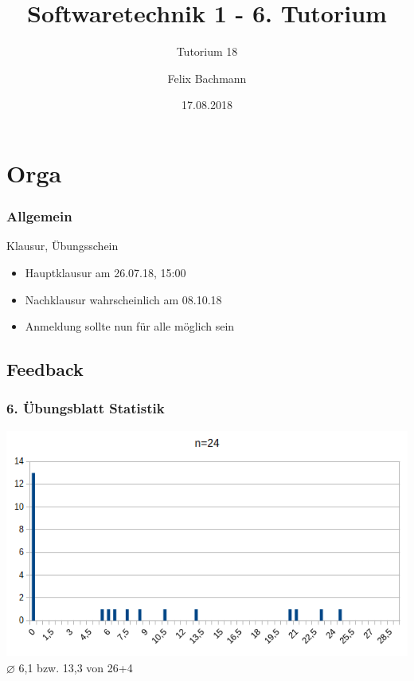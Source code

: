 \documentclass[18pt]{beamer}
\title[SWT1]{Softwaretechnik 1 - 6. Tutorium}
\subtitle{Tutorium 18}
\author{Felix Bachmann}
\date{17.08.2018}
\institute{KIT - Institut für Programmstrukturen und Datenorganisation (IPD)}
\begin{document}
	
\setcounter{tocdepth}{2}
	
\begin{frame}
\titlepage
\end{frame}

\begin{frame}
\tableofcontents
\end{frame}


\section{Orga}
	\begin{frame}
		\frametitle{Allgemein}
		\begin{block}{Klausur, Übungsschein}
			\begin{itemize}
				\item Hauptklausur am 26.07.18, 15:00
				\item Nachklausur wahrscheinlich am 08.10.18
				\item Anmeldung sollte nun für alle möglich sein
			\end{itemize}
		\end{block}
	\end{frame}

	\subsection{Feedback}
	\begin{frame}
		\frametitle{6. Übungsblatt Statistik}
		\includegraphics[scale=0.7]{./pics/tut6/statistics-ub6.png}
		\linebreak \centering $\diameter$ 6,1 bzw. 13,3 von 26+4
	\end{frame}
\end{document}
